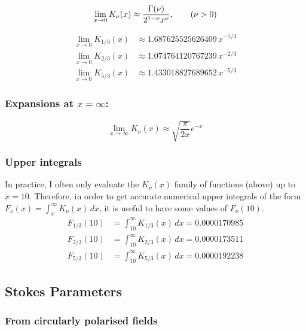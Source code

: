 \documentclass{article}
\begin{document}
\begin{equation}
    \lim_{x\rightarrow0} K_\nu(x)
        \approx \frac{\Gamma(\nu)}{2^{1-\nu}x^\nu}, \qquad (\nu > 0) \\
\end{equation}

\begin{align}
    \lim_{x\rightarrow0} K_{1/3}(x)
        &\approx 1.687625525626409\,x^{-1/3} \\
    \lim_{x\rightarrow0} K_{2/3}(x)
        &\approx 1.074764120767239\,x^{-2/3} \\
    \lim_{x\rightarrow0} K_{5/3}(x)
        &\approx 1.433018827689652\,x^{-5/3}
\end{align}

\subsubsection{Expansions at $x=\infty$:}

\begin{equation}
    \lim_{x\rightarrow\infty} K_\nu(x)
        \approx \sqrt{\frac{\pi}{2x}}e^{-x}
\end{equation}

\subsubsection{Upper integrals}

In practice, I often only evaluate the $K_\nu(x)$ family of functions (above) up to $x = 10$.
Therefore, in order to get accurate numerical upper integrals of the form $F_\nu(x) = \int_x^\infty K_\nu(x)\,dx$, it is useful to have some values of $F_\nu(10)$.
\begin{align}
    F_{1/3}(10) &= \int_{10}^\infty K_{1/3}(x)\,dx = 0.0000170985 \\
    F_{2/3}(10) &= \int_{10}^\infty K_{2/3}(x)\,dx = 0.0000173511 \\
    F_{5/3}(10) &= \int_{10}^\infty K_{5/3}(x)\,dx = 0.0000192238
\end{align}

\subsection{Stokes Parameters}

\subsubsection{From circularly polarised fields}
\end{document}
